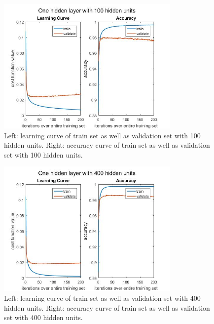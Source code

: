 \documentclass[conference]{IEEEtran}
\begin{document}
\begin{figure}[h!]
\centerline{\includegraphics[width=3.5in]{LCAC100.jpg}}
\caption{Left: learning curve of train set as well as validation set with 100 hidden units. Right: accuracy curve of train set as well as validation set with 100 hidden units.}
\label{1hidden100}
\end{figure}



\begin{figure}[h!]
\centerline{\includegraphics[width=3.5in]{LCAC400.jpg}}
\caption{Left: learning curve of train set as well as validation set with 400 hidden units. Right: accuracy curve of train set as well as validation set with 400 hidden units.}
\label{1hidden400}
\end{figure}
\end{document}
